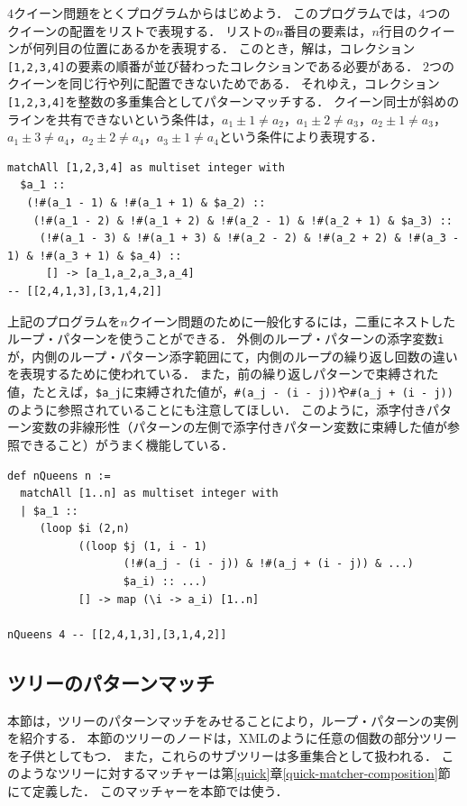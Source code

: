 $4$クイーン問題をとくプログラムからはじめよう．
このプログラムでは，$4$つのクイーンの配置をリストで表現する．
リストの$n$番目の要素は，$n$行目のクイーンが何列目の位置にあるかを表現する．
このとき，解は，コレクション\lstinline|[1,2,3,4]|の要素の順番が並び替わったコレクションである必要がある．
$2$つのクイーンを同じ行や列に配置できないためである．
それゆえ，コレクション\lstinline|[1,2,3,4]|を整数の多重集合としてパターンマッチする．
クイーン同士が斜めのラインを共有できないという条件は，$a_1 \pm 1 \neq a_2$，$a_1 \pm 2 \neq a_3$，$a_2 \pm 1 \neq a_3$，$a_1 \pm 3 \neq a_4$，$a_2 \pm 2 \neq a_4$，$a_3 \pm 1 \neq a_4$という条件により表現する．
\begin{lstlisting}[language=egison,numbers=none]
matchAll [1,2,3,4] as multiset integer with
  $a_1 ::
   (!#(a_1 - 1) & !#(a_1 + 1) & $a_2) ::
    (!#(a_1 - 2) & !#(a_1 + 2) & !#(a_2 - 1) & !#(a_2 + 1) & $a_3) ::
     (!#(a_1 - 3) & !#(a_1 + 3) & !#(a_2 - 2) & !#(a_2 + 2) & !#(a_3 - 1) & !#(a_3 + 1) & $a_4) ::
      [] -> [a_1,a_2,a_3,a_4]
-- [[2,4,1,3],[3,1,4,2]]
\end{lstlisting}
上記のプログラムを$n$クイーン問題のために一般化するには，二重にネストしたループ・パターンを使うことができる．
外側のループ・パターンの添字変数\lstinline|i|が，内側のループ・パターン添字範囲にて，内側のループの繰り返し回数の違いを表現するために使われている．
また，前の繰り返しパターンで束縛された値，たとえば，\lstinline|$a_j|に束縛された値が，\lstinline|#(a_j - (i - j))|や\lstinline|#(a_j + (i - j))|のように参照されていることにも注意してほしい．
このように，添字付きパターン変数の非線形性（パターンの左側で添字付きパターン変数に束縛した値が参照できること）がうまく機能している．
\begin{lstlisting}[language=egison,numbers=none]
def nQueens n :=
  matchAll [1..n] as multiset integer with
  | $a_1 ::
     (loop $i (2,n)
           ((loop $j (1, i - 1)
                  (!#(a_j - (i - j)) & !#(a_j + (i - j)) & ...)
                  $a_i) :: ...)
           [] -> map (\i -> a_i) [1..n]

nQueens 4 -- [[2,4,1,3],[3,1,4,2]]
\end{lstlisting}

\subsection{ツリーのパターンマッチ}\label{pmo-tree}

本節は，ツリーのパターンマッチをみせることにより，ループ・パターンの実例を紹介する．
本節のツリーのノードは，XMLのように任意の個数の部分ツリーを子供としてもつ．
また，これらのサブツリーは多重集合として扱われる．
このようなツリーに対するマッチャーは第\ref{quick}章\ref{quick-matcher-composition}節にて定義した．
このマッチャーを本節では使う．

